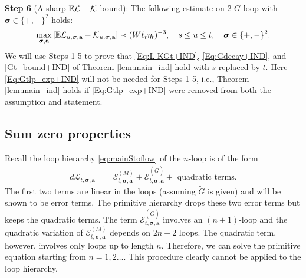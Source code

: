 \documentclass[10pt,reqno]{article}
\theoremstyle{plain} %
\theoremstyle{remark}
\numberwithin{equation}{section}
\begin{document}
\bigskip
\noindent 
\textbf{Step 6} (A sharp  $\mathbb E \cal L - \cal K$  bound): 
The following estimate on $2$-$G$-loop with $\boldsymbol{\sigma}\in\{+,-\}^2$ holds: 
\begin{equation}\label{Eq:Gtlp_exp_flow}
 \max_{\boldsymbol{\sigma}, \textbf{a}}\left|\mathbb E{\cal L}_{u, \boldsymbol{\sigma}, \textbf{a}}-{\cal K}_{u, \boldsymbol{\sigma}, \textbf{a}}\right|\prec (W\ell_t\eta_t)^{-3},\quad  
 s \le u \le t, \quad\boldsymbol{\sigma}\in\{+,-\}^2.
\end{equation}
We will use Steps 1-5 to  prove  that \eqref{Eq:L-KGt+IND}, \eqref{Eq:Gdecay+IND}, and \eqref{Gt_bound+IND} of Theorem \ref{lem:main_ind} hold with $s$ replaced by $t$. Here \eqref{Eq:Gtlp_exp+IND} will not be needed for Steps 1-5, i.e.,  Theorem \ref{lem:main_ind}  holds if \eqref{Eq:Gtlp_exp+IND} were removed from both the assumption and statement. 


 

 



 

\subsection{Sum zero properties} %
 





 


Recall the loop hierarchy \eqref{eq:mainStoflow} of the $n$-loop  is of the form 
\begin{align}
    d\mathcal{L}_{t, \boldsymbol{\sigma}, \textbf{a}} =&
    \mathcal{E}^{(M)}_{t, \boldsymbol{\sigma}, \textbf{a}} 
    +
    \mathcal{E}^{(\widetilde{G})}_{t, \boldsymbol{\sigma}, \textbf{a}} 
    + \mbox{ quadratic terms} . 
\end{align}
The first two terms are linear in the loops (assuming $\tilde G$ is given) and will be shown to be error terms. The primitive hierarchy drops these two error terms but keeps the quadratic terms.  The  term $  \mathcal{E}^{(\widetilde{G})}_{t, \boldsymbol{\sigma}, \textbf{a}} $  involves an $(n+1)$-loop and the quadratic variation of  $ \mathcal{E}^{(M)}_{t, \boldsymbol{\sigma}, \textbf{a}} $ depends on $2n+2$ loops.  The quadratic term, however,  involves only loops up to length $n$.  Therefore, we can solve the primitive equation starting from $n=1, 2 \ldots$. This procedure clearly cannot be applied to the loop hierarchy. 
\end{document}
